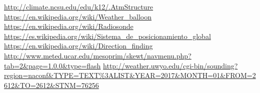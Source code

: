 \documentclass[12pt,letterpaper]{article}
\begin{document}
\begin{thebibliography}{2}
 \url{http://climate.ncsu.edu/edu/k12/.AtmStructure}
 \url{https://en.wikipedia.org/wiki/Weather_balloon}
 \url{https://en.wikipedia.org/wiki/Radiosonde}
 \url{https://es.wikipedia.org/wiki/Sistema_de_posicionamiento_global}
 \url{https://en.wikipedia.org/wiki/Direction_finding}
 \url{http://www.meted.ucar.edu/mesoprim/skewt/navmenu.php?tab=2&page=1.0.0&type=flash}
 \url{http://weather.uwyo.edu/cgi-bin/sounding?region=naconf&TYPE=TEXT%3ALIST&YEAR=2017&MONTH=01&FROM=2612&TO=2612&STNM=76256}
\end{thebibliography}
\end{document}
